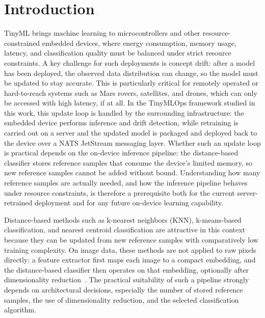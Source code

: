 \documentclass[sigconf,review,nonacm]{acmart}
\begin{document}


\maketitle

\section{Introduction}
TinyML brings machine learning to microcontrollers and other resource-constrained embedded devices, where energy consumption, memory usage, latency, and classification quality must be balanced under strict resource constraints.
A key challenge for such deployments is concept drift: after a model has been deployed, the observed data distribution can change, so the model must be updated to stay accurate.
This is particularly critical for remotely operated or hard-to-reach systems such as Mars rovers, satellites, and drones, which can only be accessed with high latency, if at all.
In the TinyMLOps framework studied in this work, this update loop is handled by the surrounding infrastructure: the embedded device performs inference and drift detection, while retraining is carried out on a server and the updated model is packaged and deployed back to the device over a NATS JetStream messaging layer.
Whether such an update loop is practical depends on the on-device inference pipeline: the distance-based classifier stores reference samples that consume the device's limited memory, so new reference samples cannot be added without bound.
Understanding how many reference samples are actually needed, and how the inference pipeline behaves under resource constraints, is therefore a prerequisite both for the current server-retrained deployment and for any future on-device learning capability.

Distance-based methods such as k-nearest neighbors (KNN), k-means-based classification, and nearest centroid classification are attractive in this context because they can be updated from new reference samples with comparatively low training complexity.
On image data, these methods are not applied to raw pixels directly: a feature extractor first maps each image to a compact embedding, and the distance-based classifier then operates on that embedding, optionally after dimensionality reduction~\cite{disabato2020incremental}.
The practical suitability of such a pipeline strongly depends on architectural decisions, especially the number of stored reference samples, the use of dimensionality reduction, and the selected classification algorithm.
\end{document}
